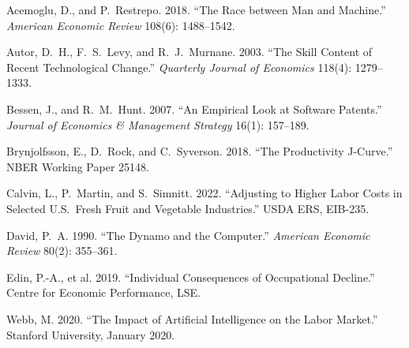 \documentclass[11pt]{article}
\begin{document}
\begin{description}\itemsep0pt
\item Acemoglu, D., and P.\ Restrepo. 2018. ``The Race between Man and Machine.'' \emph{American Economic Review} 108(6): 1488--1542.
\item Autor, D.~H., F.~S.\ Levy, and R.~J.\ Murnane. 2003. ``The Skill Content of Recent Technological Change.'' \emph{Quarterly Journal of Economics} 118(4): 1279--1333.
\item Bessen, J., and R.~M.\ Hunt. 2007. ``An Empirical Look at Software Patents.'' \emph{Journal of Economics \& Management Strategy} 16(1): 157--189.
\item Brynjolfsson, E., D.\ Rock, and C.\ Syverson. 2018. ``The Productivity J-Curve.'' NBER Working Paper 25148.
\item Calvin, L., P.\ Martin, and S.\ Simnitt. 2022. ``Adjusting to Higher Labor Costs in Selected U.S.\ Fresh Fruit and Vegetable Industries.'' USDA ERS, EIB-235.
\item David, P.~A. 1990. ``The Dynamo and the Computer.'' \emph{American Economic Review} 80(2): 355--361.
\item Edin, P.-A., et al. 2019. ``Individual Consequences of Occupational Decline.'' Centre for Economic Performance, LSE.
\item Webb, M. 2020. ``The Impact of Artificial Intelligence on the Labor Market.'' Stanford University, January 2020.
\end{description}
\end{document}
